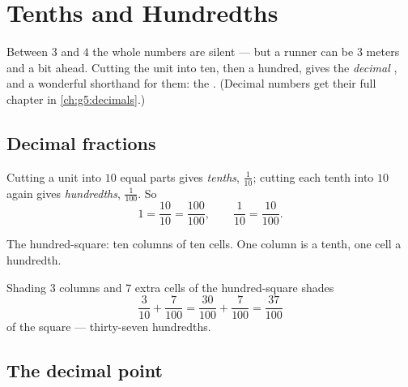 \chapter{Tenths and Hundredths}\label{ch:g4:decimals}

Between $3$ and $4$ the whole numbers are silent --- but a runner can
be $3$ meters and a bit ahead. Cutting the unit into ten, then a
hundred, gives the \emph{decimal }, and a wonderful
shorthand for them: the . (Decimal numbers get their
full chapter in \cref{ch:g5:decimals}.)

\section{Decimal fractions}

\begin{definition}\label{def:g4:decimals:def}
Cutting a unit into $10$ equal parts gives \emph{tenths},
$\frac{1}{10}$; cutting each tenth into $10$ again gives
\emph{hundredths}, $\frac{1}{100}$. So
\[
1 = \frac{10}{10} = \frac{100}{100},
\qquad
\frac{1}{10} = \frac{10}{100}.
\]
\end{definition}

\begin{omfigure}

{\small The hundred-square: ten columns of ten cells. One column is a
tenth, one cell a hundredth.}
\end{omfigure}

\begin{example}\label{ex:g4:decimals:count}
Shading $3$ columns and $7$ extra cells of the hundred-square shades
\[
\frac{3}{10} + \frac{7}{100} = \frac{30}{100} + \frac{7}{100}
= \frac{37}{100}
\]
of the square --- thirty-seven hundredths.
\end{example}

\section{The decimal point}

